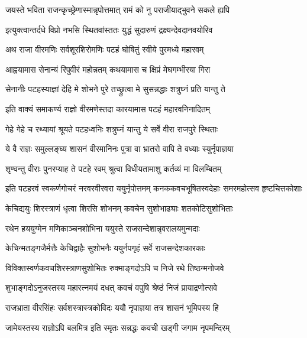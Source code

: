 \twolineshloka
{जयस्ते भविता राजन्कृच्छ्रेणास्मान्नृपोत्तमात्}
{रामं को नु पराजीयाद्भुवने सकले ह्यपि}%

\twolineshloka
{इत्युक्त्वान्तर्दधे विप्रो नभसि स्थितवांस्ततः}
{युद्धं सुदारुणं द्रक्ष्यन्देवदानवयोरिव}%


\twolineshloka
{अथ राजा वीरमणिः सर्वशूरशिरोमणिः}
{पटहं घोषितुं स्वीये पुरमध्ये महारवम्}%

\twolineshloka
{आह्वयामास सेनान्यं रिपुवीरं महोन्नतम्}
{कथयामास च क्षिप्रं मेघगम्भीरया गिरा}%


\twolineshloka
{सेनानीः पटहस्याज्ञां देहि मे शोभने पुरे}
{तच्छ्रुत्वा मे सुसन्नद्धाः शत्रुघ्नं प्रति यान्तु ते}%

\twolineshloka
{इति वाक्यं समाकर्ण्य राज्ञो वीरमणेस्तदा}
{कारयामास पटहं महारवनिनादितम्}%

\twolineshloka
{गेहे गेहे च रथ्यायां श्रूयते पटहध्वनिः}
{शत्रुघ्नं यान्तु ये सर्वे वीरा राजपुरे स्थिताः}%

\twolineshloka
{ये वै राज्ञः समुल्लङ्घ्य शासनं वीरमानिनः}
{पुत्रा वा भ्रातरो वापि ते वध्याः स्युर्नृपाज्ञया}%

\twolineshloka
{शृण्वन्तु वीराः पुनरप्याह ते पटहे रवम्}
{श्रुत्वा विधीयतामाशु कर्तव्यं मा विलम्बितम्}%


\fourlineindentedshloka
{इति पटहरवं स्वकर्णगोचरं}
{नरवरवीरवरा ययुर्नृपोत्तमम्}
{कनककवचभूषितस्वदेहाः}
{समरमहोत्सव हृष्टचित्तकोशाः}%

\twolineshloka
{केचिद्ययुः शिरस्त्राणं धृत्वा शिरसि शोभनम्}
{कवचेन सुशोभाढ्याः शतकोटिसुशोभिताः}%

\twolineshloka
{रथेन हययुग्मेन मणिकाञ्चनशोभिना}
{ययुस्ते राजसन्देशान्नृवरालयमुन्मदाः}%

\twolineshloka
{केचिन्मतङ्गजैर्मत्तैः केचिद्वाहैः सुशोभनैः}
{ययुर्नपगृहं सर्वे राजसन्देशकारकाः}%

\twolineshloka
{विविक्तस्वर्णकवचशिरस्त्राणसुशोभितः}
{रुक्माङ्गदोऽपि च निजे रथे तिष्ठन्मनोजवे}%

\twolineshloka
{शुभाङ्गदोऽनुजस्तस्य महारत्नमयं दधत्}
{कवचं वपुषि श्रेष्ठं निजं प्रायाद्रणोत्सवे}%

\twolineshloka
{राजभ्राता वीरसिंहः सर्वशस्त्रास्त्रकोविदः}
{ययौ नृपाज्ञया तत्र शासनं भूमिपस्य हि}%

\twolineshloka
{जामेयस्तस्य राज्ञोऽपि बलमित्र इति स्मृतः}
{सन्नद्धः कवची खड्गी जगाम नृपमन्दिरम्}%

